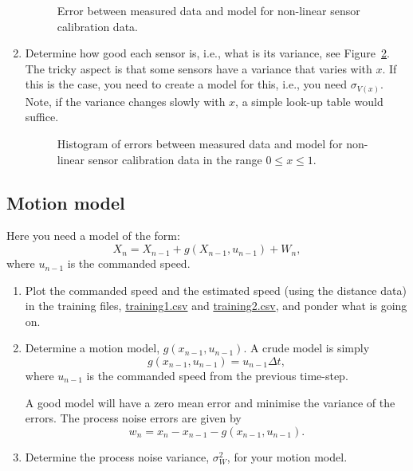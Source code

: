\documentclass[a4paper, 12pt]{article}
\newcommand{\var}[1]{\sigma_{#1}^2}
\newcommand{\std}[1]{\sigma_{#1}}
\newcommand{\reffig}[1]{\mbox{Figure~\ref{fig:#1}}}
\begin{document}
\begin{enumerate}
    \begin{figure}[!h]
  \centering
  
  \caption{Error between measured data and model for non-linear sensor
    calibration data.}
  \label{fig:errors}
  \end{figure}

\item Determine how good each sensor is, i.e., what is its variance,
  see \reffig{histogram}.  The tricky aspect is that some sensors have
  a variance that varies with $x$.  If this is the case, you need to
  create a model for this, i.e., you need $\std{V(x)}$.  Note, if the
  variance changes slowly with $x$, a simple look-up table would
  suffice.

  \begin{figure}[!h]
  \centering
  
  \caption{Histogram of errors between measured data and model for
    non-linear sensor calibration data in the range $0 \le x \le 1$.}
  \label{fig:histogram}
  \end{figure}

\end{enumerate}


\subsection{Motion model}

Here you need a model of the form:
%
\begin{equation}
  X_n = X_{n-1} + g(X_{n-1}, u_{n-1}) + W_n,
\end{equation}
%
where $u_{n-1}$ is the commanded speed.

\begin{enumerate}
\item Plot the commanded speed and the estimated speed (using the
  distance data) in the training files, \url{training1.csv} and
  \url{training2.csv}, and ponder what is going on.

\item Determine a motion model, $g(x_{n-1}, u_{n-1})$.  A crude model
  is simply
  \begin{equation}
    g(x_{n-1}, u_{n-1}) = u_{n-1} \Delta t,
  \end{equation}
  where $u_{n-1}$ is the commanded speed from the previous time-step.

  A good model will have a zero mean error and minimise the variance
  of the errors.  The process noise errors are given by
  \begin{equation}
    w_n = x_n - x_{n-1} - g(x_{n-1}, u_{n-1}).
  \end{equation}

\item Determine the process noise variance, $\var{W}$, for your motion model.

\end{enumerate}
\end{document}
